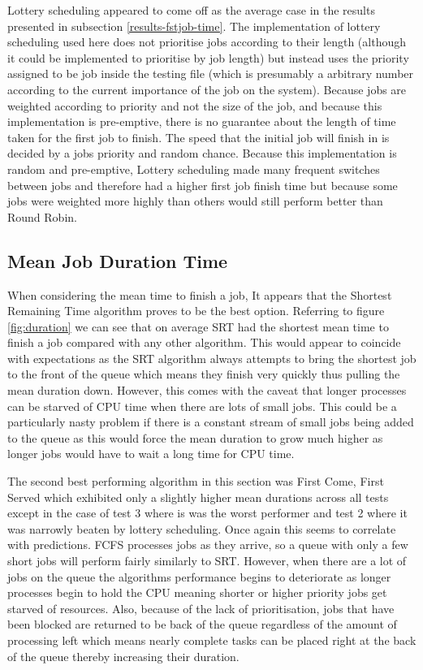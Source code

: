 \documentclass{acm_proc_article-sp}
\begin{document}
Lottery scheduling appeared to come off as the average case in the results presented in subsection \ref{results-fstjob-time}. The implementation of lottery scheduling used here does not prioritise jobs according to their length (although it could be implemented to prioritise by job length) but instead uses the priority assigned to be job inside the testing file (which is presumably a arbitrary number according to the current importance of the job on the system). Because jobs are weighted according to priority and not the size of the job, and because this implementation is pre-emptive, there is no guarantee about the length of time taken for the first job to finish. The speed that the initial job will finish in is decided by a jobs priority and random chance. Because this implementation is random and pre-emptive, Lottery scheduling made many frequent switches between jobs and therefore had a higher first job finish time but because some jobs were weighted more highly than others would still perform better than Round Robin.

\subsection{Mean Job Duration Time}
When considering the mean time to finish a job, It appears that the Shortest Remaining Time algorithm proves to be the best option. Referring to figure \ref{fig:duration} we can see that on average SRT had the shortest mean time to finish a job compared with any other algorithm. This would appear to coincide with expectations as the SRT algorithm always attempts to bring the shortest job to the front of the queue which means they finish very quickly thus pulling the mean duration down. However, this comes with the caveat that longer processes can be starved of CPU time when there are lots of small jobs. This could be a particularly nasty problem if there is a constant stream of small jobs being added to the queue as this would force the mean duration to grow much higher as longer jobs would have to wait a long time for CPU time.

The second best performing algorithm in this section was First Come, First Served which exhibited only a slightly higher mean durations across all tests except in the case of test 3 where is was the worst performer and test 2 where it was narrowly beaten by lottery scheduling. Once again this seems to correlate with predictions. FCFS processes jobs as they arrive, so a queue with only a few short jobs will perform fairly similarly to SRT. However, when there are a lot of jobs on the queue the algorithms performance begins to deteriorate as longer processes begin to hold the CPU meaning shorter or higher priority jobs get starved of resources. Also, because of the lack of prioritisation, jobs that have been blocked are returned to be back of the queue regardless of the amount of processing left which means nearly complete tasks can be placed right at the back of the queue thereby increasing their duration.
\end{document}

